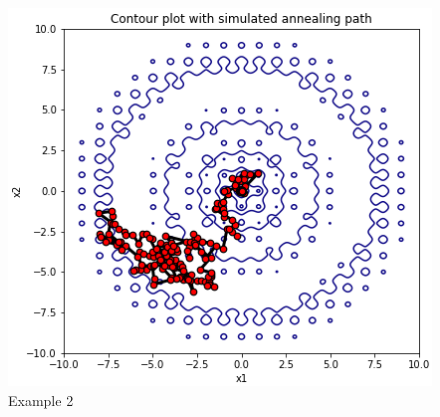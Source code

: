 \begin{figure}[h]
\begin{minipage}[b][0.36\textwidth]{0.34\textwidth}
      \includegraphics[width=\textwidth]{Pictures/sa_convergence-ackley_contour18.png}
      \caption{Example 2}\label{fig:SA_cont2}
    \end{minipage}
\end{figure}
